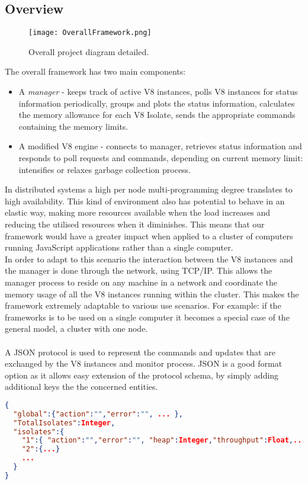 \documentclass{l4proj}
\begin{document}
\subsection{Overview}
\begin{figure}[!ht]
  \caption{Overall project diagram detailed.}
  \centering
    \texttt{[image: OverallFramework.png]}
\end{figure}
The overall framework has two main components:
\begin{itemize}
\item A \textit{manager} - keeps track of active V8 instances, polls V8 instances for status information periodically, groups and plots the status information, calculates the memory allowance for each V8 Isolate, sends the appropriate commands containing the memory limits.
\item A modified V8 engine - connects to manager, retrieves status information and responds to poll requests and commands, depending on current memory limit: intensifies or relaxes garbage collection process.
\end{itemize}
In distributed systems a high per node multi-programming degree translates to high availability. This kind of environment also has potential to behave in an elastic way, making more resources available when the load increases and reducing the utilised resources when it diminishes. This means that our framework would have a greater impact when applied to a cluster of computers running JavaScript applications rather than a single computer.\\
In order to adapt to this scenario the interaction between the V8 instances and the manager is done through the network, using TCP/IP. This allows the manager process to reside on any machine in a network and coordinate the memory usage of all the V8 instances running within the cluster. This makes the framework extremely adaptable to various use scenarios. For example: if the frameworks is to be used on a single computer it becomes a special case of the general model, a cluster with one node.
\\\\
\hspace*{3em} A JSON protocol is used to represent the commands and updates that are exchanged by the V8 instances and monitor process. JSON is a good format option as it allows easy extension of the protocol schema, by simply adding additional keys the the concerned entities.
\newpage
\begin{lstlisting}[language=json,firstnumber=1]
{
  "global":{"action":"","error":"", ... },
  "TotalIsolates":Integer,
  "isolates":{
    "1":{ "action":"","error":"", "heap":Integer,"throughput":Float,... },
    "2":{...}
    ...
  }
}
\end{lstlisting}
\end{document}
